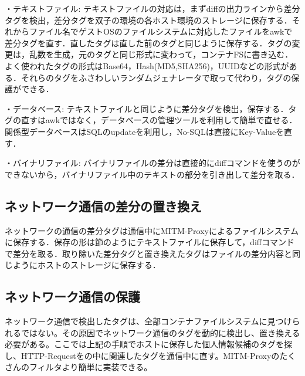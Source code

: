 \documentclass[submit]{ipsj}
\begin{document}
\begin{description}
\item{・テキストファイル: }
テキストファイルの対応は，まずdiffの出力ラインから差分タグを検出，差分タグを双子の環境の各ホスト環境のストレージに保存する．それからファイル名でゲストOSのファイルシステムに対応したファイルをawkで差分タグを直す．直したタグは直した前のタグと同じように保存する．タグの変更は，乱数を生成，元のタグと同じ形式に変わって，コンテナFSに書き込む．よく使われたタグの形式はBase64，Hash(MD5,SHA256)，UUIDなどの形式がある．それらのタグをふさわしいランダムジェナレータで取って代わり，タグの保護ができる．
\item{・データベース: }
テキストファイルと同じように差分タグを検出，保存する．タグの直すはawkではなく，データベースの管理ツールを利用して簡単で直せる．関係型データベースはSQLのupdateを利用し，No-SQLは直接にKey-Valueを直す．
\item{・バイナリファイル: }
バイナリファイルの差分は直接的にdiffコマンドを使うのができないから，バイナリファイル中のテキストの部分を引き出して差分を取る．
\end{description}


\subsection{ネットワーク通信の差分の置き換え}
ネットワークの通信の差分タグは通信中にMITM-Proxyによるファイルシステムに保存する．保存の形は節\label{sec:net}のようにテキストファイルに保存して，diffコマンドで差分を取る．取り除いた差分タグと置き換えたタグはファイルの差分内容と同じようにホストのストレージに保存する．

\subsection{ネットワーク通信の保護}

ネットワーク通信で検出したタグは、全部コンテナファイルシステムに見つけられるではない。その原因でネットワーク通信のタグを動的に検出し、置き換える必要がある。ここでは上記の手順でホストに保存した個人情報候補のタグを探し、HTTP-Requestをの中に関連したタグを通信中に直す。MITM-Proxyのたくさんのフィルタより簡単に実装できる。








 
 
\end{document}
